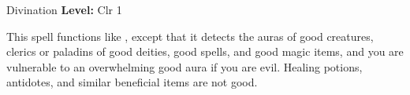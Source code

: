 {Divination}
{
	\textbf{Level:}
	Clr 1\\
}
{
	This spell functions like , except that it detects the auras of good creatures, clerics or paladins of good deities, good spells, and good magic items, and you are vulnerable to an overwhelming good aura if you are evil. Healing potions, antidotes, and similar beneficial items are not good.

}
